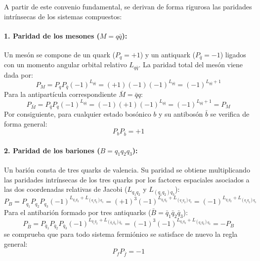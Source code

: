 A partir de este convenio fundamental, se derivan de forma rigurosa las paridades intrínsecas de los sistemas compuestos:

\paragraph{1. Paridad de los mesones ($M = q\bar{q}$):}
Un mesón se compone de un quark ($P_q = +1$) y un antiquark ($P_{\bar{q}} = -1$) ligados con un momento angular orbital relativo $L_{q\bar{q}}$. La paridad total del mesón viene dada por:
\begin{equation}
    P_M = P_q P_{\bar{q}} (-1)^{L_{q\bar{q}}} = (+1)(-1)(-1)^{L_{q\bar{q}}} = (-1)^{L_{q\bar{q}} + 1}
\end{equation}
Para la antipartícula correspondiente $\bar{M} = \bar{q}q$:
\begin{equation}
    P_{\bar{M}} = P_{\bar{q}} P_q (-1)^{L_{q\bar{q}}} = (-1)(+1)(-1)^{L_{q\bar{q}}} = (-1)^{L_{q\bar{q}} + 1} = P_M
\end{equation}
Por consiguiente, para cualquier estado bosónico $b$ y su antibosón $\bar{b}$ se verifica de forma general:
\begin{equation}
    P_b P_{\bar{b}} = +1
\end{equation}

\paragraph{2. Paridad de los bariones ($B = q_1 q_2 q_3$):}
Un barión consta de tres quarks de valencia. Su paridad se obtiene multiplicando las paridades intrínsecas de los tres quarks por los factores espaciales asociados a las dos coordenadas relativas de Jacobi ($L_{q_1 q_2}$ y $L_{(q_1 q_2)q_3}$):
\begin{equation}
    P_B = P_{q_1} P_{q_2} P_{q_3} (-1)^{L_{q_1 q_2} + L_{(q_1 q_2)q_3}} = (+1)^3 (-1)^{L_{q_1 q_2} + L_{(q_1 q_2)q_3}} = (-1)^{L_{q_1 q_2} + L_{(q_1 q_2)q_3}}
\end{equation}
Para el antibarión formado por tres antiquarks ($\bar{B} = \bar{q}_1 \bar{q}_2 \bar{q}_3$):
\begin{equation}
    P_{\bar{B}} = P_{\bar{q}_1} P_{\bar{q}_2} P_{\bar{q}_3} (-1)^{L_{\bar{q}_1 \bar{q}_2} + L_{(\bar{q}_1 \bar{q}_2)\bar{q}_3}} = (-1)^3 (-1)^{L_{q_1 q_2} + L_{(q_1 q_2)q_3}} = -P_B
\end{equation}
se comprueba que para todo sistema fermiónico se satisface de nuevo la regla general:
\begin{equation}
    P_f P_{\bar{f}} = -1
\end{equation}
\newpage

